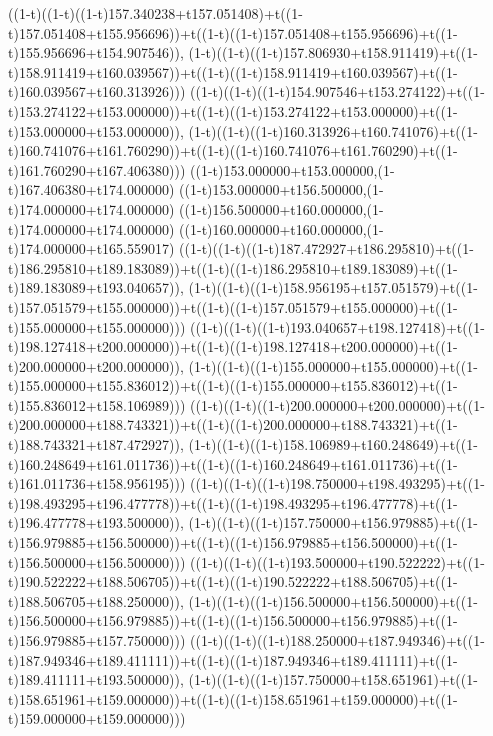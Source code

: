 ((1-t)((1-t)((1-t)157.340238+t157.051408)+t((1-t)157.051408+t155.956696))+t((1-t)((1-t)157.051408+t155.956696)+t((1-t)155.956696+t154.907546)),                                     (1-t)((1-t)((1-t)157.806930+t158.911419)+t((1-t)158.911419+t160.039567))+t((1-t)((1-t)158.911419+t160.039567)+t((1-t)160.039567+t160.313926)))
((1-t)((1-t)((1-t)154.907546+t153.274122)+t((1-t)153.274122+t153.000000))+t((1-t)((1-t)153.274122+t153.000000)+t((1-t)153.000000+t153.000000)),                                     (1-t)((1-t)((1-t)160.313926+t160.741076)+t((1-t)160.741076+t161.760290))+t((1-t)((1-t)160.741076+t161.760290)+t((1-t)161.760290+t167.406380)))
((1-t)153.000000+t153.000000,(1-t)167.406380+t174.000000)
((1-t)153.000000+t156.500000,(1-t)174.000000+t174.000000)
((1-t)156.500000+t160.000000,(1-t)174.000000+t174.000000)
((1-t)160.000000+t160.000000,(1-t)174.000000+t165.559017)
((1-t)((1-t)((1-t)187.472927+t186.295810)+t((1-t)186.295810+t189.183089))+t((1-t)((1-t)186.295810+t189.183089)+t((1-t)189.183089+t193.040657)),                                     (1-t)((1-t)((1-t)158.956195+t157.051579)+t((1-t)157.051579+t155.000000))+t((1-t)((1-t)157.051579+t155.000000)+t((1-t)155.000000+t155.000000)))
((1-t)((1-t)((1-t)193.040657+t198.127418)+t((1-t)198.127418+t200.000000))+t((1-t)((1-t)198.127418+t200.000000)+t((1-t)200.000000+t200.000000)),                                     (1-t)((1-t)((1-t)155.000000+t155.000000)+t((1-t)155.000000+t155.836012))+t((1-t)((1-t)155.000000+t155.836012)+t((1-t)155.836012+t158.106989)))
((1-t)((1-t)((1-t)200.000000+t200.000000)+t((1-t)200.000000+t188.743321))+t((1-t)((1-t)200.000000+t188.743321)+t((1-t)188.743321+t187.472927)),                                     (1-t)((1-t)((1-t)158.106989+t160.248649)+t((1-t)160.248649+t161.011736))+t((1-t)((1-t)160.248649+t161.011736)+t((1-t)161.011736+t158.956195)))
((1-t)((1-t)((1-t)198.750000+t198.493295)+t((1-t)198.493295+t196.477778))+t((1-t)((1-t)198.493295+t196.477778)+t((1-t)196.477778+t193.500000)),                                     (1-t)((1-t)((1-t)157.750000+t156.979885)+t((1-t)156.979885+t156.500000))+t((1-t)((1-t)156.979885+t156.500000)+t((1-t)156.500000+t156.500000)))
((1-t)((1-t)((1-t)193.500000+t190.522222)+t((1-t)190.522222+t188.506705))+t((1-t)((1-t)190.522222+t188.506705)+t((1-t)188.506705+t188.250000)),                                     (1-t)((1-t)((1-t)156.500000+t156.500000)+t((1-t)156.500000+t156.979885))+t((1-t)((1-t)156.500000+t156.979885)+t((1-t)156.979885+t157.750000)))
((1-t)((1-t)((1-t)188.250000+t187.949346)+t((1-t)187.949346+t189.411111))+t((1-t)((1-t)187.949346+t189.411111)+t((1-t)189.411111+t193.500000)),                                     (1-t)((1-t)((1-t)157.750000+t158.651961)+t((1-t)158.651961+t159.000000))+t((1-t)((1-t)158.651961+t159.000000)+t((1-t)159.000000+t159.000000)))
